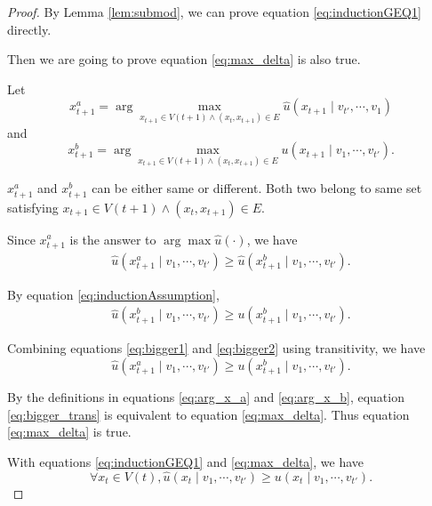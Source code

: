 \begin{lem}
\begin{proof}
By Lemma \ref{lem:submod}, we can prove equation \eqref{eq:inductionGEQ1} directly.

Then we are going to prove equation \eqref{eq:max_delta} is also true.

Let 
\begin{equation}
\label{eq:arg_x_a}
x^{a}_{t+1} = \arg \max_{ x_{t+1} \in V(t+1) \land ( x_{t}, x_{t+1} ) \in E} \hat{u}( x_{t+1} \mid v_{t'} , \cdots , v_{1} )
\end{equation}
and 
\begin{equation}
\label{eq:arg_x_b}
x^{b}_{t+1} = \arg \max_{ x_{t+1} \in V(t+1) \land ( x_{t}, x_{t+1}) \in E } u( x_{t+1} \mid v_{1} , \cdots , v_{t'} ). 
\end{equation}

$ x^{a}_{t+1} $ and $ x^{b}_{t+1} $ can be either same or different. Both two belong to same set satisfying $ x_{t+1} \in V(t+1) \land (x_{t}, x_{t+1}) \in E $.

Since $ x^{a}_{t+1} $ is the answer to $ \arg \max \hat{u}(\cdot) $, we have
\begin{equation}
\label{eq:bigger1}
\begin{aligned}
\hat{u}( x^{a}_{t+1} \mid v_{1} , \cdots , v_{t'} ) \geq \hat{u}( x^{b}_{t+1} \mid v_{1} , \cdots , v_{t'} ).
\end{aligned}
\end{equation}


By equation \eqref{eq:inductionAssumption},
\begin{equation}
\label{eq:bigger2}
\begin{aligned}
\hat{u}( x^{b}_{t+1} \mid v_{1} , \cdots , v_{t'} ) \geq u( x^{b}_{t+1} \mid v_{1} , \cdots , v_{t'} ).
\end{aligned}
\end{equation}

Combining equations \eqref{eq:bigger1} and \eqref{eq:bigger2} using transitivity, we have 
\begin{equation}
\label{eq:bigger_trans}
 \hat{u}( x^{a}_{t+1} \mid v_{1} , \cdots , v_{t'} ) \geq  u ( x^{b}_{t+1} \mid v_{1} , \cdots , v_{t'} ).
\end{equation}

By the definitions in equations \eqref{eq:arg_x_a} and \eqref{eq:arg_x_b}, equation \eqref{eq:bigger_trans} is equivalent to equation \eqref{eq:max_delta}. Thus equation \eqref{eq:max_delta} is true.

With equations \eqref{eq:inductionGEQ1} and \eqref{eq:max_delta}, we have
\begin{equation}
\label{eq:inductConclusion}
\forall x_{t} \in V(t), \hat{u}( x_{t} \mid v_{1} , \cdots , v_{t'} ) \geq u( x_{t} \mid v_{1} , \cdots , v_{t'} ).
\end{equation}


\end{proof}
\end{lem}
